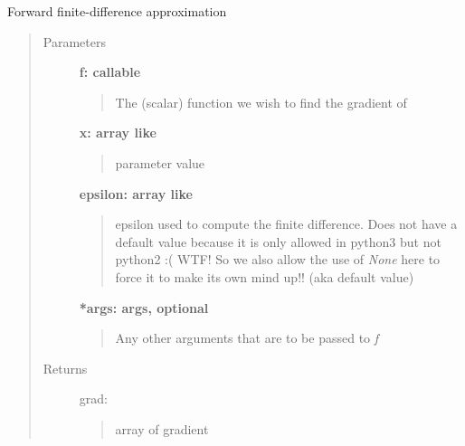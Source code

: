 \documentclass[letterpaper,10pt,english]{sphinxmanual}
\begin{document}
\begin{fulllineitems}
Forward finite-difference approximation
\begin{quote}\begin{description}
\item[{Parameters}] \leavevmode
\textbf{f: callable}
\begin{quote}

The (scalar) function we wish to find the gradient of
\end{quote}

\textbf{x: array like}
\begin{quote}

parameter value
\end{quote}

\textbf{epsilon: array like}
\begin{quote}

epsilon used to compute the finite difference.  Does not 
have a default value because it is only allowed in 
python3 but not python2 :( WTF!  So we also allow the
use of \emph{None} here to force it to make its own mind
up!! (aka default value)
\end{quote}

\textbf{*args: args, optional}
\begin{quote}

Any other arguments that are to be passed to \emph{f}
\end{quote}

\item[{Returns}] \leavevmode
grad: \href{http://docs.scipy.org/doc/numpy/reference/generated/numpy.ndarray.html\#numpy.ndarray}{}
\begin{quote}

array of gradient
\end{quote}

\end{description}\end{quote}

\end{fulllineitems}
\end{document}
